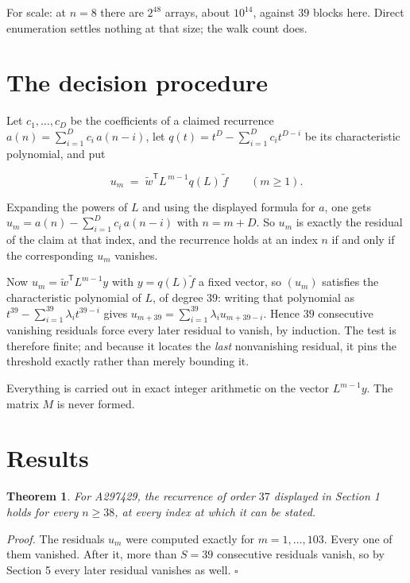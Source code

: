 \documentclass[11pt]{article}
\newtheorem{theorem}{Theorem}
\theoremstyle{definition}
\begin{document}
For scale: at $n = 8$ there are $2^{48}$ arrays, about $10^{14}$, against $39$ blocks here. Direct enumeration settles nothing at that size; the walk count does.

\section{The decision procedure}

Let $c_1,\dots,c_D$ be the coefficients of a claimed recurrence $a(n) = \sum_{i=1}^{D} c_i\,a(n-i)$, let $q(t) = t^{D} - \sum_{i=1}^{D} c_i t^{D-i}$ be its characteristic polynomial, and put

\[u_m \;=\; \tilde w^{\mathsf T} L^{\,m-1} q(L)\,\tilde f \qquad (m \ge 1).\]

Expanding the powers of $L$ and using the displayed formula for $a$, one gets $u_m = a(n) - \sum_{i=1}^{D} c_i\,a(n-i)$ with $n = m + D$. So $u_m$ is exactly the residual of the claim at that index, and the recurrence holds at an index $n$ if and only if the corresponding $u_m$ vanishes.

Now $u_m = \tilde w^{\mathsf T} L^{m-1} y$ with $y = q(L)\tilde f$ a fixed vector, so $(u_m)$ satisfies the characteristic polynomial of $L$, of degree $39$: writing that polynomial as $t^{39} - \sum_{i=1}^{39} \lambda_i t^{39-i}$ gives $u_{m+39} = \sum_{i=1}^{39} \lambda_i u_{m+39-i}$. Hence $39$ consecutive vanishing residuals force every later residual to vanish, by induction. The test is therefore finite; and because it locates the {\itshape last} nonvanishing residual, it pins the threshold exactly rather than merely bounding it.

Everything is carried out in exact integer arithmetic on the vector $L^{m-1}y$. The matrix $M$ is never formed.

\section{Results}

\begin{theorem} For A297429, the recurrence of order $37$ displayed in Section 1 holds for every $n \ge 38$, at every index at which it can be stated.\end{theorem}

{\itshape Proof.} The residuals $u_m$ were computed exactly for $m = 1,\dots,103$. Every one of them vanished. After it, more than $S = 39$ consecutive residuals vanish, so by Section 5 every later residual vanishes as well. $\square$
\end{document}
